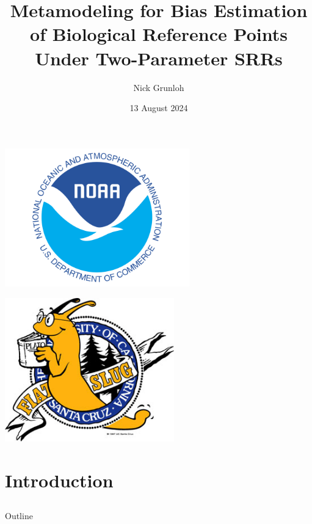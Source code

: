 \documentclass[ xcolor = pdftex, dvipsnames, table ]{beamer}
\title{Metamodeling for Bias Estimation of Biological Reference Points Under Two-Parameter SRRs}
\author{
Nick Grunloh
}
\date{13 August 2024}
\begin{document}
%
\begin{frame}
\titlepage
\vspace*{-3cm}
\begin{minipage}[h!]{0.49\textwidth}
\hspace*{-0.25cm}
\includegraphics[width=0.6\textwidth]{noaaText.png}
\end{minipage}
\begin{minipage}[h!]{0.49\textwidth}
\hspace*{2cm}
\includegraphics[width=0.55\textwidth]{slug.jpg}
\end{minipage}
\end{frame}


%
\section{Introduction}
\subsection{}
\begin{frame}{Outline}
\end{frame}
\end{document}
